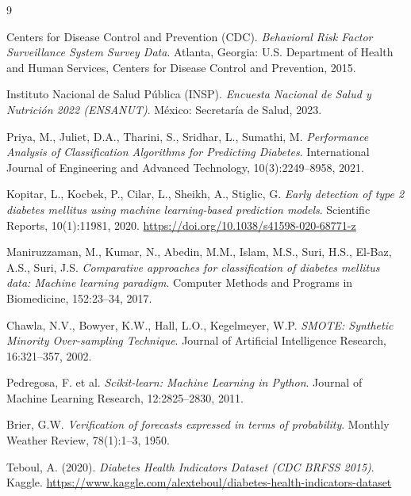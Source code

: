 \documentclass[12pt,a4paper]{article}
\begin{document}
\begin{thebibliography}{9}

Centers for Disease Control and Prevention (CDC).
\textit{Behavioral Risk Factor Surveillance System Survey Data}.
Atlanta, Georgia: U.S. Department of Health and Human Services, Centers for Disease Control and Prevention, 2015.

Instituto Nacional de Salud Pública (INSP).
\textit{Encuesta Nacional de Salud y Nutrición 2022 (ENSANUT)}.
México: Secretaría de Salud, 2023.

Priya, M., Juliet, D.A., Tharini, S., Sridhar, L., Sumathi, M.
\textit{Performance Analysis of Classification Algorithms for Predicting Diabetes}.
International Journal of Engineering and Advanced Technology, 10(3):2249--8958, 2021.

Kopitar, L., Kocbek, P., Cilar, L., Sheikh, A., Stiglic, G.
\textit{Early detection of type 2 diabetes mellitus using machine learning-based prediction models}.
Scientific Reports, 10(1):11981, 2020. \url{https://doi.org/10.1038/s41598-020-68771-z}

Maniruzzaman, M., Kumar, N., Abedin, M.M., Islam, M.S., Suri, H.S., El-Baz, A.S., Suri, J.S.
\textit{Comparative approaches for classification of diabetes mellitus data: Machine learning paradigm}.
Computer Methods and Programs in Biomedicine, 152:23--34, 2017.

Chawla, N.V., Bowyer, K.W., Hall, L.O., Kegelmeyer, W.P.
\textit{SMOTE: Synthetic Minority Over-sampling Technique}.
Journal of Artificial Intelligence Research, 16:321--357, 2002.

Pedregosa, F. et al.
\textit{Scikit-learn: Machine Learning in Python}.
Journal of Machine Learning Research, 12:2825--2830, 2011.

Brier, G.W.
\textit{Verification of forecasts expressed in terms of probability}.
Monthly Weather Review, 78(1):1--3, 1950.

Teboul, A. (2020).
\textit{Diabetes Health Indicators Dataset (CDC BRFSS 2015)}.
Kaggle. \url{https://www.kaggle.com/alexteboul/diabetes-health-indicators-dataset}

\end{thebibliography}
\end{document}
